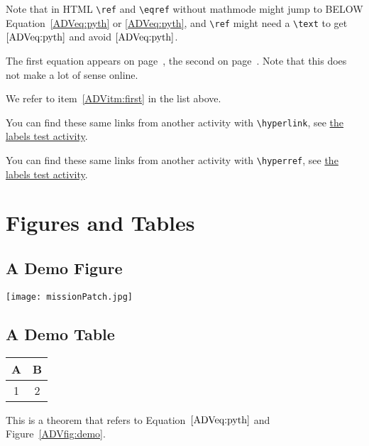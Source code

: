 \documentclass[landscape]{ximera}
\begin{document}
Note that in HTML \verb|\ref| and \verb|\eqref| without mathmode might jump to BELOW Equation~\ref{ADVeq:pyth} or \eqref{ADVeq:pyth}, and
\verb|\ref| might need a \verb|\text| to get $\text{\ref{ADVeq:pyth}}$ and avoid $\ref{ADVeq:pyth}$.

The first equation appears on page~\pageref{ADVeq:pyth}, the second on page~\pageref{ADVtag:pyth2}. 
Note that this does not make a lot of sense online.

We refer to item~\ref{ADVitm:first} in the list above.

You can find these same links from another activity with \verb|\hyperlink|, see \hyperlink{xim:labelsFromOtherActivity}{the labels test activity}.

You can find these same links from another activity with \verb|\hyperref|, see \hyperref[xim:labelsFromOtherActivity]{the labels test activity}.

\section{Figures and Tables}

\subsection{A Demo Figure}
\label{ADVsec:fig}

\begin{image}[0.3\textwidth]
  \centering
  \texttt{[image: missionPatch.jpg]} %
\end{image}
  \label{ADVfig:demo}

\subsection{A Demo Table}

{
  \centering
  \begin{tabular}{|c|c|}
    \hline
    A & B \\
    \hline
    1 & 2 \\
    \hline
  \end{tabular}
  \label{ADVtab:example}
}

 \begin{theorem} \label{ADVthm:1}
  
  This is a theorem that refers to Equation~$\eqref{ADVeq:pyth}$ and Figure~\ref{ADVfig:demo}.

  
 \end{theorem}
\end{document}
